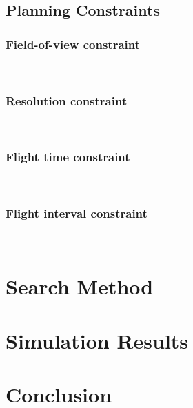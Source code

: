 \documentclass[conference]{IEEEtran}
\begin{document}
\subsection{Planning Constraints}

\subsubsection{Field-of-view constraint}
~
\subsubsection{Resolution constraint}
~
\subsubsection{Flight time constraint}
~
\subsubsection{Flight interval constraint}
~

\section{Search Method}

\section{Simulation Results}

\section{Conclusion}
\end{document}
